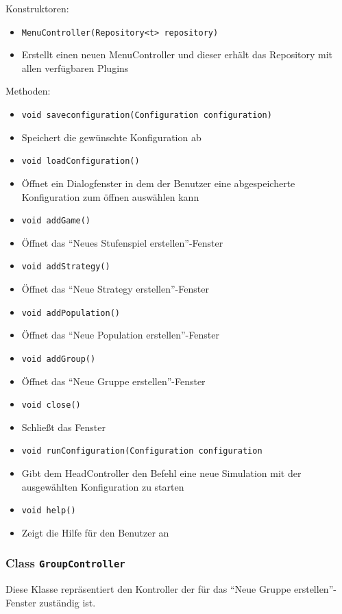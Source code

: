 \documentclass[parskip=full,11pt]{scrartcl}
\begin{document}
Konstruktoren:
\begin{itemize}\itemsep -10pt
\item \texttt{MenuController(Repository<t> repository)}
\item[] Erstellt einen neuen MenuController und dieser erhält das Repository mit allen verfügbaren Plugins
\end{itemize}

Methoden:
\begin{itemize}\itemsep -10pt
\item \texttt{void saveconfiguration(Configuration configuration)}
\item[] Speichert die gewünschte Konfiguration ab

\item \texttt{void loadConfiguration()}
\item[] Öffnet ein Dialogfenster in dem der Benutzer eine abgespeicherte Konfiguration zum öffnen auswählen kann

\item \texttt{void addGame()}
\item[] Öffnet das \enquote{Neues Stufenspiel erstellen}-Fenster

\item \texttt{void addStrategy()}
\item[] Öffnet das \enquote{Neue Strategy erstellen}-Fenster

\item \texttt{void addPopulation()}
\item[] Öffnet das \enquote{Neue Population erstellen}-Fenster

\item \texttt{void addGroup()}
\item[] Öffnet das \enquote{Neue Gruppe erstellen}-Fenster

\item \texttt{void close()}
\item[] Schließt das Fenster

\item \texttt{void runConfiguration(Configuration configuration}
\item[] Gibt dem HeadController den Befehl eine neue Simulation mit der ausgewählten Konfiguration zu starten

\item \texttt{void help()}
\item[] Zeigt die Hilfe für den Benutzer an
\end{itemize}

\subsubsection{Class \texttt{GroupController}}
Diese Klasse repräsentiert den Kontroller der für das \enquote{Neue Gruppe erstellen}-Fenster zuständig ist.
\end{document}
